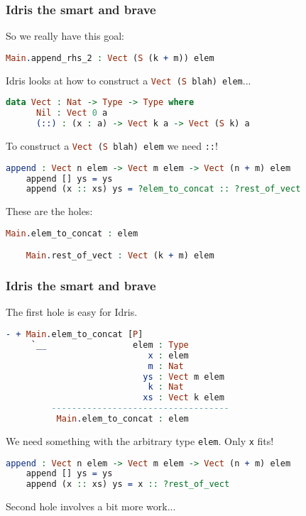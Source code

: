 \documentclass{beamer}
\begin{document}
\begin{frame}[fragile]
  \frametitle{Idris the smart and brave}

  So we really have this goal:

  \begin{lstlisting}[language=Idris]
    Main.append_rhs_2 : Vect (S (k + m)) elem
  \end{lstlisting}

  Idris looks at how to construct a \lstinline[language=Idris,columns=fixed]{Vect (S blah) elem}...

  \pause

  \begin{lstlisting}[language=Idris]
    data Vect : Nat -> Type -> Type where
      Nil : Vect 0 a
      (::) : (x : a) -> Vect k a -> Vect (S k) a
  \end{lstlisting}

  \pause
  To construct a \lstinline[language=Idris,columns=fixed]{Vect (S blah) elem} we need \texttt{::}!

  \begin{lstlisting}[language=Idris]
    append : Vect n elem -> Vect m elem -> Vect (n + m) elem
    append [] ys = ys
    append (x :: xs) ys = ?elem_to_concat :: ?rest_of_vect
  \end{lstlisting}

  \pause
  These are the holes:

  \begin{lstlisting}[language=Idris]
    Main.elem_to_concat : elem

    Main.rest_of_vect : Vect (k + m) elem
  \end{lstlisting}
\end{frame}

\begin{frame}[fragile]
  \frametitle{Idris the smart and brave}  
  The first hole is easy for Idris.

  \begin{lstlisting}[language=Idris]
    - + Main.elem_to_concat [P]
     `__                 elem : Type
                            x : elem
                            m : Nat
                           ys : Vect m elem
                            k : Nat
                           xs : Vect k elem
         -----------------------------------
          Main.elem_to_concat : elem
  \end{lstlisting}

  \pause
  We need something with the arbitrary type \texttt{elem}. Only \texttt{x} fits!

  \pause

  \begin{lstlisting}[language=Idris]
    append : Vect n elem -> Vect m elem -> Vect (n + m) elem
    append [] ys = ys
    append (x :: xs) ys = x :: ?rest_of_vect
  \end{lstlisting}

  \pause

  Second hole involves a bit more work...
\end{frame}
\end{document}
